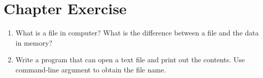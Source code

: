 \documentclass[../main.tex]{subfiles}
\begin{document}
    \section{Chapter Exercise}
    \begin{enumerate}
        \item What is a file in computer? What is the difference between a file
        and the data in memory?
        \item Write a \csharp program that can open a text file and print out
        the contents. Use command-line argument to obtain the file name.
    \end{enumerate}
\end{document}
